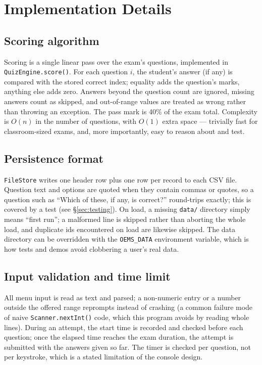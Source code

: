 \documentclass[11pt,a4paper]{article}
\begin{document}
\section{Implementation Details}
\label{sec:impl}
\subsection{Scoring algorithm}
Scoring is a single linear pass over the exam's questions, implemented in
\texttt{QuizEngine.score()}. For each question $i$, the student's answer (if any)
is compared with the stored correct index; equality adds the question's marks,
anything else adds zero. Answers beyond the question count are ignored, missing
answers count as skipped, and out-of-range values are treated as wrong rather
than throwing an exception. The pass mark is 40\% of the exam total. Complexity is
$O(n)$ in the number of questions, with $O(1)$ extra space --- trivially fast for
classroom-sized exams, and, more importantly, easy to reason about and test.

\subsection{Persistence format}
\texttt{FileStore} writes one header row plus one row per record to each CSV file.
Question text and options are quoted when they contain commas or quotes, so a
question such as ``Which of these, if any, is correct?'' round-trips exactly; this
is covered by a test (see \S\ref{sec:testing}). On load, a missing
\texttt{data/} directory simply means ``first run''; a malformed line is skipped
rather than aborting the whole load, and duplicate ids encountered on load are
likewise skipped. The data directory can be overridden with the
\texttt{OEMS\_DATA} environment variable, which is how tests and demos avoid
clobbering a user's real data.

\subsection{Input validation and time limit}
All menu input is read as text and parsed; a non-numeric entry or a number
outside the offered range reprompts instead of crashing (a common failure mode
of naive \texttt{Scanner.nextInt()} code, which this program avoids by reading
whole lines). During an attempt, the start time is recorded and checked before
each question; once the elapsed time reaches the exam duration, the attempt is
submitted with the answers given so far. The timer is checked per question, not
per keystroke, which is a stated limitation of the console design.
\end{document}
